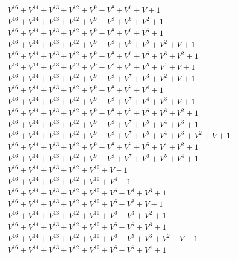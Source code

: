 \documentclass[12pt]{article}
\begin{document}
\begin{adjustwidth}{-4cm}{}
\begin{center}
\begin{longtable}{|l|}
$V^{16}  +V^{14}  +V^{13}  +V^{12}  +V^{9}  +V^{8}  +V^{6}  + V + 1$ \\
$V^{16}  +V^{14}  +V^{13}  +V^{12}  +V^{9}  +V^{8}  +V^{6}  +V^{2}  + 1$ \\
$V^{16}  +V^{14}  +V^{13}  +V^{12}  +V^{9}  +V^{8}  +V^{6}  +V^{5}  + 1$ \\
$V^{16}  +V^{14}  +V^{13}  +V^{12}  +V^{9}  +V^{8}  +V^{6}  +V^{5}  +V^{2}  + V + 1$ \\
$V^{16}  +V^{14}  +V^{13}  +V^{12}  +V^{9}  +V^{8}  +V^{6}  +V^{5}  +V^{3}  +V^{2}  + 1$ \\
$V^{16}  +V^{14}  +V^{13}  +V^{12}  +V^{9}  +V^{8}  +V^{6}  +V^{5}  +V^{4}  + V + 1$ \\
$V^{16}  +V^{14}  +V^{13}  +V^{12}  +V^{9}  +V^{8}  +V^{7}  +V^{3}  +V^{2}  + V + 1$ \\
$V^{16}  +V^{14}  +V^{13}  +V^{12}  +V^{9}  +V^{8}  +V^{7}  +V^{4}  + 1$ \\
$V^{16}  +V^{14}  +V^{13}  +V^{12}  +V^{9}  +V^{8}  +V^{7}  +V^{4}  +V^{3}  + V + 1$ \\
$V^{16}  +V^{14}  +V^{13}  +V^{12}  +V^{9}  +V^{8}  +V^{7}  +V^{5}  +V^{3}  +V^{2}  + 1$ \\
$V^{16}  +V^{14}  +V^{13}  +V^{12}  +V^{9}  +V^{8}  +V^{7}  +V^{5}  +V^{4}  +V^{3}  + 1$ \\
$V^{16}  +V^{14}  +V^{13}  +V^{12}  +V^{9}  +V^{8}  +V^{7}  +V^{5}  +V^{4}  +V^{3}  +V^{2}  + V + 1$ \\
$V^{16}  +V^{14}  +V^{13}  +V^{12}  +V^{9}  +V^{8}  +V^{7}  +V^{6}  +V^{4}  +V^{2}  + 1$ \\
$V^{16}  +V^{14}  +V^{13}  +V^{12}  +V^{9}  +V^{8}  +V^{7}  +V^{6}  +V^{5}  +V^{4}  + 1$ \\
$V^{16}  +V^{14}  +V^{13}  +V^{12}  +V^{10}  + V + 1$ \\
$V^{16}  +V^{14}  +V^{13}  +V^{12}  +V^{10}  +V^{4}  + 1$ \\
$V^{16}  +V^{14}  +V^{13}  +V^{12}  +V^{10}  +V^{5}  +V^{4}  +V^{3}  + 1$ \\
$V^{16}  +V^{14}  +V^{13}  +V^{12}  +V^{10}  +V^{6}  +V^{2}  + V + 1$ \\
$V^{16}  +V^{14}  +V^{13}  +V^{12}  +V^{10}  +V^{6}  +V^{3}  +V^{2}  + 1$ \\
$V^{16}  +V^{14}  +V^{13}  +V^{12}  +V^{10}  +V^{6}  +V^{5}  +V^{3}  + 1$ \\
$V^{16}  +V^{14}  +V^{13}  +V^{12}  +V^{10}  +V^{6}  +V^{5}  +V^{3}  +V^{2}  + V + 1$ \\
$V^{16}  +V^{14}  +V^{13}  +V^{12}  +V^{10}  +V^{6}  +V^{5}  +V^{4}  + 1$ \\

\end{longtable}
\end{center}
\end{adjustwidth}
\end{document}
